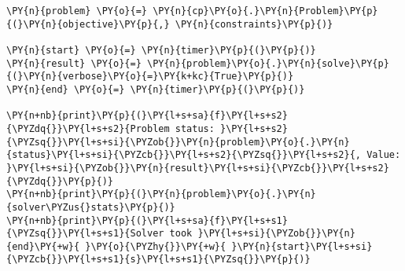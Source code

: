 \begin{tcolorbox}[breakable, size=fbox, boxrule=1pt, pad at break*=1mm,colback=cellbackground, colframe=cellborder]
    \begin{Verbatim}[commandchars=\\\{\}]
\PY{n}{problem} \PY{o}{=} \PY{n}{cp}\PY{o}{.}\PY{n}{Problem}\PY{p}{(}\PY{n}{objective}\PY{p}{,} \PY{n}{constraints}\PY{p}{)}

\PY{n}{start} \PY{o}{=} \PY{n}{timer}\PY{p}{(}\PY{p}{)}
\PY{n}{result} \PY{o}{=} \PY{n}{problem}\PY{o}{.}\PY{n}{solve}\PY{p}{(}\PY{n}{verbose}\PY{o}{=}\PY{k+kc}{True}\PY{p}{)}
\PY{n}{end} \PY{o}{=} \PY{n}{timer}\PY{p}{(}\PY{p}{)}

\PY{n+nb}{print}\PY{p}{(}\PY{l+s+sa}{f}\PY{l+s+s2}{\PYZdq{}}\PY{l+s+s2}{Problem status: }\PY{l+s+s2}{\PYZsq{}}\PY{l+s+si}{\PYZob{}}\PY{n}{problem}\PY{o}{.}\PY{n}{status}\PY{l+s+si}{\PYZcb{}}\PY{l+s+s2}{\PYZsq{}}\PY{l+s+s2}{, Value: }\PY{l+s+si}{\PYZob{}}\PY{n}{result}\PY{l+s+si}{\PYZcb{}}\PY{l+s+s2}{\PYZdq{}}\PY{p}{)}
\PY{n+nb}{print}\PY{p}{(}\PY{n}{problem}\PY{o}{.}\PY{n}{solver\PYZus{}stats}\PY{p}{)}
\PY{n+nb}{print}\PY{p}{(}\PY{l+s+sa}{f}\PY{l+s+s1}{\PYZsq{}}\PY{l+s+s1}{Solver took }\PY{l+s+si}{\PYZob{}}\PY{n}{end}\PY{+w}{ }\PY{o}{\PYZhy{}}\PY{+w}{ }\PY{n}{start}\PY{l+s+si}{\PYZcb{}}\PY{l+s+s1}{s}\PY{l+s+s1}{\PYZsq{}}\PY{p}{)}
    \end{Verbatim}
\end{tcolorbox}

